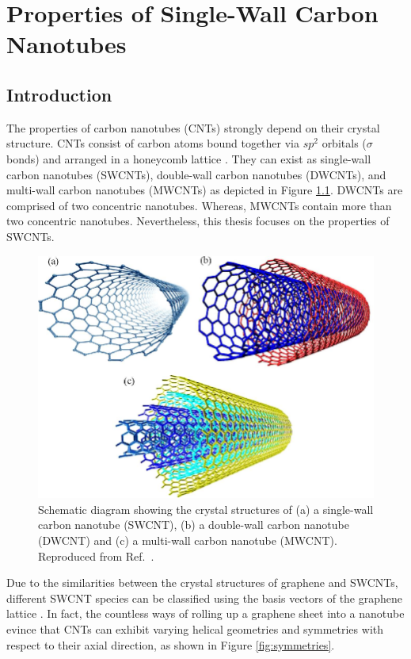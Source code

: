 \chapter{Properties of Single-Wall Carbon Nanotubes}

\section{Introduction}
The properties of carbon nanotubes (CNTs) strongly depend on their crystal structure. CNTs consist of carbon atoms bound together via $sp^2$ orbitals ($\sigma$ bonds) and arranged in a honeycomb lattice \cite{soavi2016ultrafast}. They can exist as single-wall carbon nanotubes (SWCNTs), double-wall carbon nanotubes (DWCNTs), and multi-wall carbon nanotubes (MWCNTs) as depicted in Figure \ref{fig:swcnt_mwcnt}. DWCNTs are comprised of two concentric nanotubes. Whereas, MWCNTs contain more than two concentric nanotubes. Nevertheless, this thesis focuses on the properties of SWCNTs.

\begin{figure}[ht]
	\centering
	\includegraphics[scale=1]{images/chapter_optical_props/swcnt_mwcnt_rafiq}
	\caption{Schematic diagram showing the crystal structures of (a) a single-wall carbon nanotube (SWCNT), (b) a double-wall carbon nanotube (DWCNT) and (c) a multi-wall carbon nanotube (MWCNT). Reproduced from Ref.\ \cite{rafique2016exploration}.}
	\label{fig:swcnt_mwcnt}
\end{figure}

Due to the similarities between the crystal structures of graphene and SWCNTs, different SWCNT species can be classified using the basis vectors of the graphene lattice \cite{charlier2007electronic}. In fact, the countless ways of rolling up a graphene sheet into a nanotube evince that CNTs can exhibit varying helical geometries and symmetries with respect to their axial direction, as shown in Figure \ref{fig:symmetries}.


